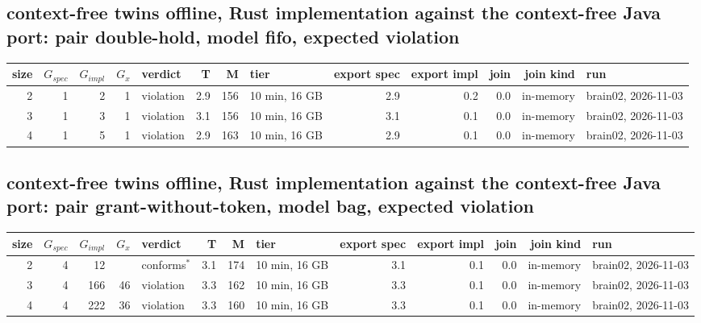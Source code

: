 \documentclass[10pt]{article}
\begin{document}
\subsection*{context-free twins offline, Rust implementation against the context-free Java port: pair \textsf{double-hold}, model fifo, expected violation}
\begin{longtable}{@{}rrrrlrrlrrrrl@{}}
\toprule
size & $G_{\mathit{spec}}$ & $G_{\mathit{impl}}$ & $G_x$ & verdict & T & M & tier & export spec & export impl & join & join kind & run \\
\midrule
\endhead
\color{red} 2 & 1 & 2 & 1 & violation & 2.9 & 156 & 10 min, 16 GB & 2.9 & 0.2 & 0.0 & in-memory & brain02, 2026-11-03 \\
\color{red} 3 & 1 & 3 & 1 & violation & 3.1 & 156 & 10 min, 16 GB & 3.1 & 0.1 & 0.0 & in-memory & brain02, 2026-11-03 \\
\color{red} 4 & 1 & 5 & 1 & violation & 2.9 & 163 & 10 min, 16 GB & 2.9 & 0.1 & 0.0 & in-memory & brain02, 2026-11-03 \\
\bottomrule
\end{longtable}
\subsection*{context-free twins offline, Rust implementation against the context-free Java port: pair \textsf{grant-without-token}, model bag, expected violation}
\begin{longtable}{@{}rrrrlrrlrrrrl@{}}
\toprule
size & $G_{\mathit{spec}}$ & $G_{\mathit{impl}}$ & $G_x$ & verdict & T & M & tier & export spec & export impl & join & join kind & run \\
\midrule
\endhead
\color{red} 2 & 4 & 12 &  & conforms$^{\ast}$ & 3.1 & 174 & 10 min, 16 GB & 3.1 & 0.1 & 0.0 & in-memory & brain02, 2026-11-03 \\
\color{red} 3 & 4 & 166 & 46 & violation & 3.3 & 162 & 10 min, 16 GB & 3.3 & 0.1 & 0.0 & in-memory & brain02, 2026-11-03 \\
\color{red} 4 & 4 & 222 & 36 & violation & 3.3 & 160 & 10 min, 16 GB & 3.3 & 0.1 & 0.0 & in-memory & brain02, 2026-11-03 \\
\bottomrule
\end{longtable}
\end{document}
